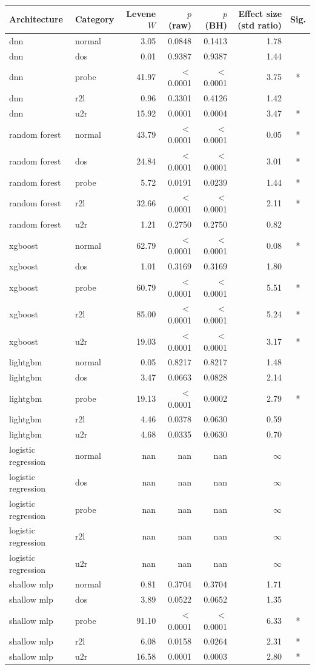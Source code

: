 \begin{tabular}{llrrrrc}
\hline
Architecture & Category & Levene $W$ & $p$ (raw) & $p$ (BH) & Effect size (std ratio) & Sig.\\
\hline
dnn & normal & 3.05 & 0.0848 & 0.1413 & 1.78 & \\
dnn & dos & 0.01 & 0.9387 & 0.9387 & 1.44 & \\
dnn & probe & 41.97 & $<$0.0001 & $<$0.0001 & 3.75 & *\\
dnn & r2l & 0.96 & 0.3301 & 0.4126 & 1.42 & \\
dnn & u2r & 15.92 & 0.0001 & 0.0004 & 3.47 & *\\
random forest & normal & 43.79 & $<$0.0001 & $<$0.0001 & 0.05 & *\\
random forest & dos & 24.84 & $<$0.0001 & $<$0.0001 & 3.01 & *\\
random forest & probe & 5.72 & 0.0191 & 0.0239 & 1.44 & *\\
random forest & r2l & 32.66 & $<$0.0001 & $<$0.0001 & 2.11 & *\\
random forest & u2r & 1.21 & 0.2750 & 0.2750 & 0.82 & \\
xgboost & normal & 62.79 & $<$0.0001 & $<$0.0001 & 0.08 & *\\
xgboost & dos & 1.01 & 0.3169 & 0.3169 & 1.80 & \\
xgboost & probe & 60.79 & $<$0.0001 & $<$0.0001 & 5.51 & *\\
xgboost & r2l & 85.00 & $<$0.0001 & $<$0.0001 & 5.24 & *\\
xgboost & u2r & 19.03 & $<$0.0001 & $<$0.0001 & 3.17 & *\\
lightgbm & normal & 0.05 & 0.8217 & 0.8217 & 1.48 & \\
lightgbm & dos & 3.47 & 0.0663 & 0.0828 & 2.14 & \\
lightgbm & probe & 19.13 & $<$0.0001 & 0.0002 & 2.79 & *\\
lightgbm & r2l & 4.46 & 0.0378 & 0.0630 & 0.59 & \\
lightgbm & u2r & 4.68 & 0.0335 & 0.0630 & 0.70 & \\
logistic regression & normal & nan & nan & nan & $\infty$ & \\
logistic regression & dos & nan & nan & nan & $\infty$ & \\
logistic regression & probe & nan & nan & nan & $\infty$ & \\
logistic regression & r2l & nan & nan & nan & $\infty$ & \\
logistic regression & u2r & nan & nan & nan & $\infty$ & \\
shallow mlp & normal & 0.81 & 0.3704 & 0.3704 & 1.71 & \\
shallow mlp & dos & 3.89 & 0.0522 & 0.0652 & 1.35 & \\
shallow mlp & probe & 91.10 & $<$0.0001 & $<$0.0001 & 6.33 & *\\
shallow mlp & r2l & 6.08 & 0.0158 & 0.0264 & 2.31 & *\\
shallow mlp & u2r & 16.58 & 0.0001 & 0.0003 & 2.80 & *\\
\hline
\end{tabular}


